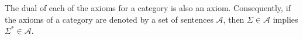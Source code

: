 The dual of each of the axioms for a category is also an axiom. Consequently, if the axioms of a category are denoted by a set of sentences $\mathcal{A}$, then $\Sigma \in \mathcal{A}$ implies $\Sigma^{*} \in \mathcal{A}$.
